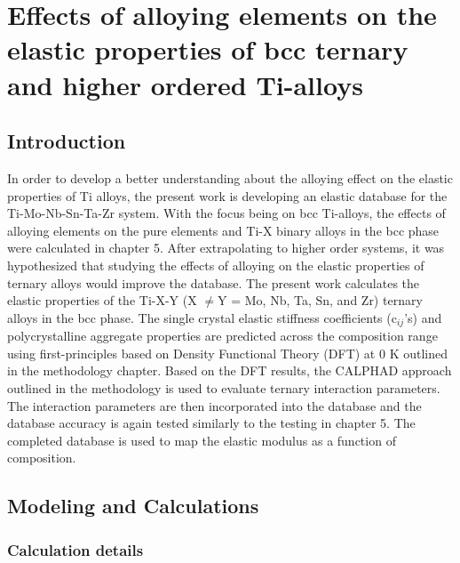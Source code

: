 \chapter{Effects of alloying elements on the elastic properties of bcc ternary and higher ordered Ti-alloys}

\section{Introduction}

In order to develop a better understanding about the alloying effect on the elastic properties of Ti alloys, the present work is developing an elastic database for the Ti-Mo-Nb-Sn-Ta-Zr system. With the focus being on bcc Ti-alloys, the effects of alloying elements on the pure elements and Ti-X binary alloys in the bcc phase were calculated in chapter 5. After extrapolating to higher order systems, it was hypothesized that studying the effects of alloying on the elastic properties of ternary alloys would improve the database. The present work calculates the elastic properties of the Ti-X-Y (X $\neq$Y = Mo, Nb, Ta, Sn, and Zr) ternary alloys in the bcc phase. The single crystal elastic stiffness coefficients (c$_{ij}$'s) and polycrystalline aggregate properties are predicted across the composition range using first-principles based on Density Functional Theory (DFT) at 0 K outlined in the methodology chapter. Based on the DFT results, the CALPHAD approach outlined in the methodology is used to evaluate ternary interaction parameters. The interaction parameters are then incorporated into the database and the database accuracy is again tested similarly to the testing in chapter 5. The completed database is used to map the elastic modulus as a function of composition.

\section{Modeling and Calculations}

\subsection{Calculation details}

